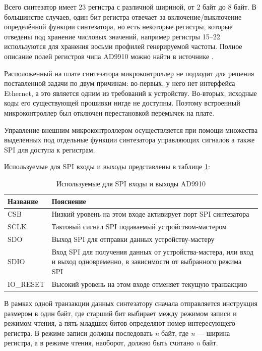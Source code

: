 \documentclass[rusmathsym, eqnumwithinsec, amspack, hyperref]{bomgost}
\begin{document}
Всего синтезатор имеет 23 регистра с различной шириной, от 2 байт до 8 байт. В большинстве случаев, один бит регистра отвечает за включение/выключение определённой функции синтезатора, но есть некоторые регистры, которые отведены под хранение числовых значений, например регистры 15–22 используются для хранения восьми профилей генерируемой частоты. Полное описание полей регистров чипа AD9910 можно найти в источнике \cite{AD9910Datasheet}.

Расположенный на плате синтезатора микроконтроллер не подходит для решения поставленной задачи по двум причинам: во-первых, у него нет интерфейса Ethernet, а это является одним из требований к устройству. Во-вторых, исходные коды его существующей прошивки нигде не доступны. Поэтому встроенный микроконтроллер был отключен перестановкой перемычек на плате.

Управление внешним микроконтроллером осуществляется при помощи множества выделенных под отдельные функции синтезатора управляющих сигналов а также SPI для доступа к регистрам.

Используемые для SPI входы и выходы представлены в таблице \ref{tab:spi_pins}:

\begin{table}[H]
\centering
\caption{Используемые для SPI входы и выходы AD9910}
\label{tab:spi_pins}
\begin{tabular}{|p{4cm}|p{8cm}|}
\hline 
\textbf{Название} & \textbf{Пояснение} \\ 
\hline 
CSB & Низкий уровень на этом входе активирует порт SPI синтезатора \\ 
\hline
SCLK & Тактовый сигнал SPI подаваемый устройством-мастером \\
\hline
SDO & Выход SPI для отправки данных устройству-мастеру \\
\hline
SDIO & Вход SPI для получения данных от устройства-мастера, или вход и выход одновременно, в зависимости от выбранного режима SPI \\
\hline 
IO\_RESET & Высокий уровень на этом входе отменяет текущую транзакцию \\
\hline
\end{tabular} 
\end{table}

В рамках одной транзакции данных синтезатору сначала отправляется инструкция размером в один байт, где старший бит выбирает между режимом записи и режимом чтения, а пять младших битов определяют номер интересующего регистра. В режиме записи должны последовать {\em n} байт, где {\em n} — ширина регистра, а в режиме чтения, наоборот, должно быть считано {\em n} байт.
\end{document}
